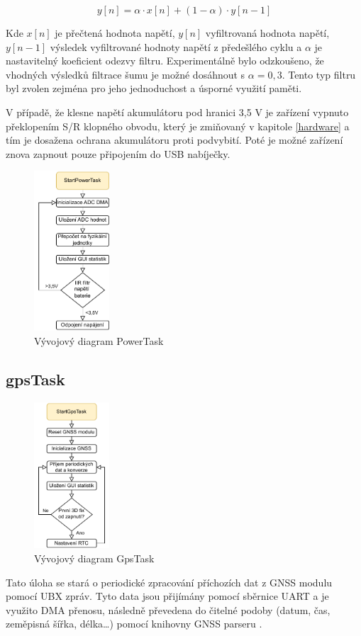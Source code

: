 \begin{equation} \label{eq:EMA}
y[n]=\alpha \cdot x[n] + (1-\alpha)\cdot y[n-1]
\end{equation}

Kde $ x[n] $ je přečtená hodnota napětí, $ y[n] $ vyfiltrovaná hodnota napětí, $ y[n-1] $ výsledek vyfiltrované hodnoty napětí z předešlého cyklu a $ \alpha $ je nastavitelný koeficient odezvy filtru. Experimentálně bylo odzkoušeno, že vhodných výsledků filtrace šumu je možné dosáhnout s $ \alpha = 0,3$. Tento typ filtru byl zvolen zejména pro jeho jednoduchost a úsporné využití paměti.

V případě, že klesne napětí akumulátoru pod hranici 3,5 V je zařízení vypnuto překlopením S/R klopného obvodu, který je zmiňovaný v kapitole \ref{hardware} a tím je dosažena ochrana akumulátoru proti podvybití. Poté je možné zařízení znova zapnout pouze připojením do USB nabíječky.


\begin{figure}[h]
    \centering
    \includegraphics[width=0.25\textwidth]{obrazky/PowerTask}
    \caption{Vývojový diagram PowerTask}
\end{figure}
\subsection{gpsTask}
\begin{figure}[h]
    \centering
    \includegraphics[width=0.25\textwidth]{obrazky/GpsTask}
    \caption{Vývojový diagram GpsTask}
\end{figure}
Tato úloha se stará o periodické zpracování příchozích dat z GNSS modulu pomocí \ac{UBX} zpráv. Tyto data jsou přijímány pomocí sběrnice \ac{UART} a je využito DMA přenosu, následně převedena do čitelné podoby (datum, čas, zeměpisná šířka, délka\ldots) pomocí knihovny GNSS parseru \cite{SimpleMethod2021}.

